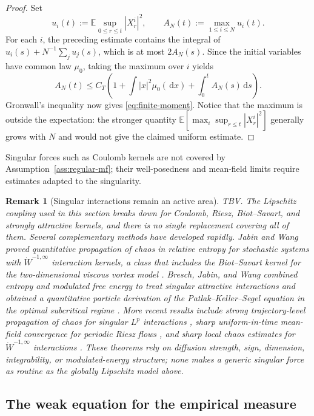 \documentclass[11pt]{amsart}
\numberwithin{equation}{section}
\theoremstyle{plain}
\newtheorem{remark}[theorem]{Remark}
\newcommand{\E}{\mathbb{E}}
\newcommand{\dd}{\,\mathrm{d}}
\newcommand{\abs}[1]{\left\lvert#1\right\rvert}
\begin{document}
\begin{proof}
Set
\[
 u_i(t):=\E\sup_{0\leq r\leq t}\abs{X_r^i}^2,
 \qquad
 A_N(t):=\max_{1\leq i\leq N}u_i(t).
\]
For each $i$, the preceding estimate contains the integral of
$u_i(s)+N^{-1}\sum_j u_j(s)$, which is at most $2A_N(s)$.  Since the
initial variables have common law $\mu_0$, taking the maximum over $i$ yields
\[
 A_N(t)
 \leq C_T\left(1+\int\abs{x}^2\mu_0(\dd x)
 +\int_0^t A_N(s)\dd s\right).
\]
Gronwall's inequality now gives \eqref{eq:finite-moment}.  Notice that the maximum is outside the
expectation: the stronger quantity
$\E[\max_i\sup_{r\leq t}\abs{X_r^i}^2]$ generally grows with $N$ and would
not give the claimed uniform estimate.
\end{proof}

Singular forces such as Coulomb kernels are not covered by
Assumption~\ref{ass:regular-mf}; their well-posedness and mean-field limits
require estimates adapted to the singularity.

\begin{remark}[Singular interactions remain an active area] TBV. 
The Lipschitz coupling used in this section breaks down for Coulomb, Riesz,
Biot--Savart, and strongly attractive kernels, and there is no single
replacement covering all of them.  Several complementary methods have
developed rapidly.  Jabin and Wang proved quantitative propagation of chaos
in relative entropy for stochastic systems with
$\dot W^{-1,\infty}$ interaction kernels, a class that includes the
Biot--Savart kernel for the two-dimensional viscous vortex model
\cite{JabinWang2018}.  Bresch, Jabin, and Wang combined entropy and modulated
free energy to treat singular attractive interactions and obtained a
quantitative particle derivation of the Patlak--Keller--Segel equation in the
optimal subcritical regime \cite{BreschJabinWang2023}.  More recent results
include strong trajectory-level propagation of chaos for singular
$L^p$ interactions \cite{HaoRocknerZhang2024}, sharp uniform-in-time
mean-field convergence for periodic Riesz flows
\cite{ChodronRosenzweigSerfaty2025}, and sharp local chaos estimates for
$\dot W^{-1,\infty}$ interactions \cite{Wang2026}.  These theorems rely on
diffusion strength, sign, dimension, integrability, or modulated-energy
structure; none makes a generic singular force as routine as the globally
Lipschitz model above.
\end{remark}


\subsection{The weak equation for the empirical measure}
\end{document}
